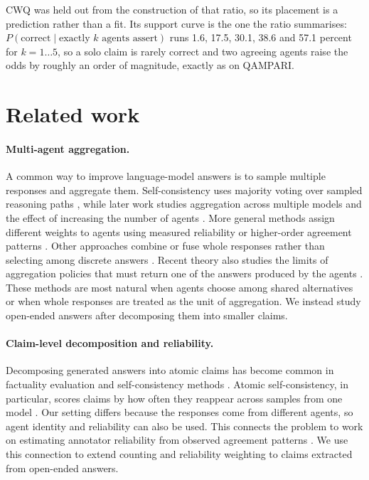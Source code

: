 \documentclass[11pt]{article}
\begin{document}
CWQ was held out from the construction of that ratio, so its placement is a prediction rather than a fit. Its support curve is the one the ratio summarises: $P(\mathrm{correct} \mid \text{exactly } k \text{ agents assert})$ runs 1.6, 17.5, 30.1, 38.6 and 57.1 percent for $k = 1 \dots 5$, so a solo claim is rarely correct and two agreeing agents raise the odds by roughly an order of magnitude, exactly as on QAMPARI.

\section{Related work}
\label{sec:related}

\paragraph{Multi-agent aggregation.}
A common way to improve language-model answers is to sample multiple responses and aggregate them. Self-consistency uses majority voting over sampled reasoning paths \citep{wang2022self}, while later work studies aggregation across multiple models and the effect of increasing the number of agents \citep{li2024agents}. More general methods assign different weights to agents using measured reliability or higher-order agreement patterns \citep{ai2025majority}. Other approaches combine or fuse whole responses rather than selecting among discrete answers \citep{jiang2023llm,chen2023universal}. Recent theory also studies the limits of aggregation policies that must return one of the answers produced by the agents \citep{ananthakrishnan2026power}. These methods are most natural when agents choose among shared alternatives or when whole responses are treated as the unit of aggregation. We instead study open-ended answers after decomposing them into smaller claims.

\paragraph{Claim-level decomposition and reliability.}
Decomposing generated answers into atomic claims has become common in factuality evaluation and self-consistency methods \citep{thirukovalluru2024atomic,zhang2024atomic,ning2025mad,wan2025fastfact,liu2025verifact,goel2025zero,panou2025harnessing}. Atomic self-consistency, in particular, scores claims by how often they reappear across samples from one model \citep{thirukovalluru2024atomic}. Our setting differs because the responses come from different agents, so agent identity and reliability can also be used. This connects the problem to work on estimating annotator reliability from observed agreement patterns \citep{dawid1979maximum,sinha2018fast,majdi2023crowd,kuzin2025improving}. We use this connection to extend counting and reliability weighting to claims extracted from open-ended answers.
\end{document}
